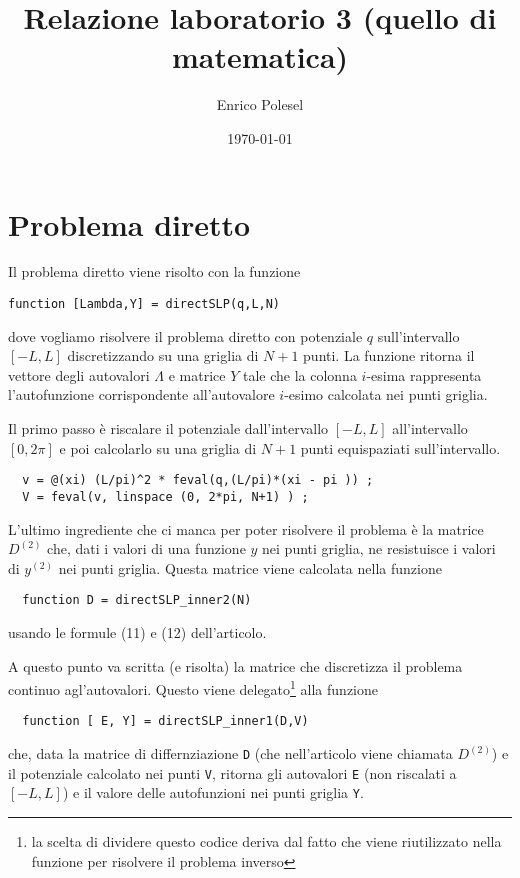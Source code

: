 \documentclass[a4paper,10pt]{article}
\title{Relazione laboratorio 3 (quello di matematica)}
\author{Enrico Polesel}
\date{\today}
\theoremstyle{plain}
\theoremstyle{definition}
\theoremstyle{remark}
\begin{document}
\maketitle

\lstset{language=Matlab,frame=single}

\section{Problema diretto}

Il problema diretto viene risolto con la funzione
\begin{lstlisting}
function [Lambda,Y] = directSLP(q,L,N)
\end{lstlisting}
dove vogliamo risolvere il problema diretto con potenziale $q$
sull'intervallo $[-L,L]$ discretizzando su una griglia di $N+1$
punti. La funzione ritorna il vettore degli autovalori $\Lambda$ e
matrice $Y$ tale che la colonna $i$-esima rappresenta l'autofunzione
corrispondente all'autovalore $i$-esimo calcolata nei punti griglia. 

Il primo passo è riscalare il potenziale dall'intervallo $[-L,L]$
all'intervallo $[0,2\pi ]$ e poi calcolarlo su una griglia di $N+1$
punti equispaziati sull'intervallo.
\begin{lstlisting}
  v = @(xi) (L/pi)^2 * feval(q,(L/pi)*(xi - pi )) ;
  V = feval(v, linspace (0, 2*pi, N+1) ) ;
\end{lstlisting}

L'ultimo ingrediente che ci manca per poter risolvere il problema è la
matrice $D^{(2)}$ che, dati i valori di una funzione $y$ nei punti
griglia, ne resistuisce i valori di $y^{(2)}$ nei punti
griglia. Questa matrice viene calcolata nella funzione
\begin{lstlisting}
  function D = directSLP_inner2(N)
\end{lstlisting}
usando le formule (11) e (12) dell'articolo.

A questo punto va scritta (e risolta) la matrice che discretizza il
problema continuo agl'autovalori. Questo viene delegato\footnote{la
  scelta di dividere questo codice deriva dal fatto che viene
  riutilizzato nella funzione per risolvere il problema inverso} alla
funzione
\begin{lstlisting}
  function [ E, Y] = directSLP_inner1(D,V)
\end{lstlisting}
che, data la matrice di differnziazione \lstinline{D} (che
nell'articolo viene chiamata $D^{(2)}$) e il potenziale calcolato nei
punti \lstinline{V}, ritorna gli autovalori \lstinline{E} (non
riscalati a $[-L,L]$) e il valore delle autofunzioni nei punti griglia
\lstinline{Y}.
\end{document}
